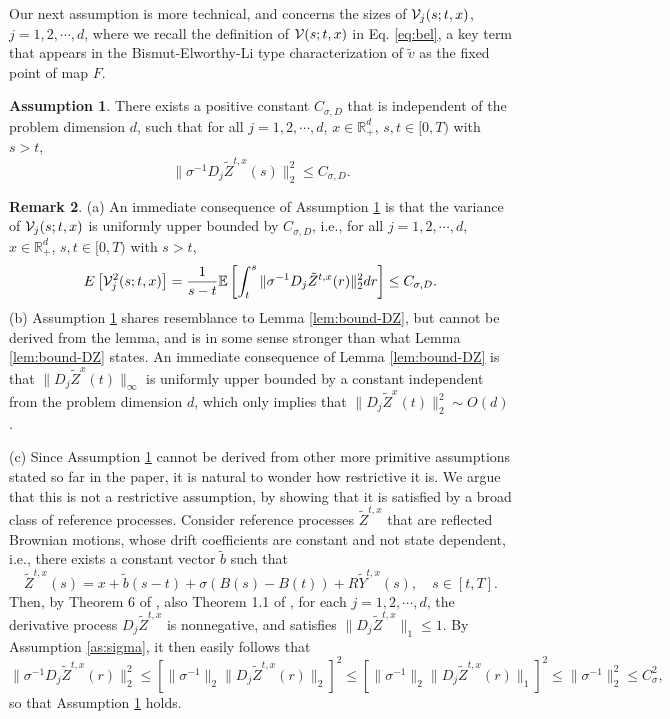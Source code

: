 \documentclass[11pt]{article}
\theoremstyle{definition}
\newtheorem{assumption}{Assumption}[section]
\newtheorem{remark}[assumption]{Remark}
\theoremstyle{plain}
\newcommand{\R}{\mathbb{R}}
\newcommand{\E}{\mathbb{E}}
\newcommand{\cV}{{\cal V}}
\newcommand{\tb}{\tilde{b}}
\begin{document}
Our next assumption is more technical, and concerns the sizes of $\cV_j(s; t,x)$, $j = 1, 2, \cdots, d$, 
where we recall the definition of $\cV(s; t,x)$ in Eq. \eqref{eq:bel}, a key term that appears in the Bismut-Elworthy-Li type 
characterization of $\tilde v$ as the fixed point of map $F$.
\begin{assumption}\label{as:sigma-D}
There exists a positive constant $C_{\sigma, D}$ that is independent of the problem dimension $d$, such that 
for all $j=1,2, \cdots, d$, $x\in \R_+^d$, $s, t \in [0, T)$ with $s > t$, 
\begin{equation}\label{eq:sigma-D}
\|\sigma^{-1} D_j \tilde Z^{t,x}(s)\|_2^2 \leq C_{\sigma, D}.
\end{equation}
\end{assumption}
\begin{remark} 
(a) An immediate consequence of Assumption \ref{as:sigma-D} is that the variance of $\cV_j(s; t,x)$ is uniformly upper bounded by $C_{\sigma, D}$, i.e., 
for all $j=1,2, \cdots, d$, $x\in \R_+^d$, $s, t \in [0, T)$ with $s > t$, 
\begin{equation}
E\left[\cV_j^2(s; t,x)\right] = \frac{1}{s-t}\E\left[\int_t^s \|\sigma^{-1} D_j \tilde Z^{t,x}(r)\|_2^2 dr\right] \leq C_{\sigma, D}.
\end{equation}
(b) Assumption \ref{as:sigma-D} shares resemblance to Lemma \ref{lem:bound-DZ}, but cannot be derived from the lemma, 
and is in some sense stronger than what Lemma \ref{lem:bound-DZ} states. 
An immediate consequence of Lemma \ref{lem:bound-DZ} is that $\|D_j \tilde Z^x(t)\|_\infty$ is uniformly upper bounded by 
a constant independent from the problem dimension $d$, which only implies that $\|D_j \tilde Z^x(t)\|_2^2 \sim O(d)$.

(c) Since Assumption \ref{as:sigma-D} cannot be derived from other more primitive assumptions stated so far in the paper, 
it is natural to wonder how restrictive it is. We argue that this is not a restrictive assumption, 
by showing that it is satisfied by a broad class of reference processes. Consider reference processes $\tilde Z^{t,x}$ 
that are reflected Brownian motions, whose drift coefficients are constant and not state dependent, i.e., 
there exists a constant vector $\tb$ such that 
\begin{equation}
\tilde{Z}^{t,x}(s) = x + \tb (s-t) + \sigma (B(s) - B(t)) + R \tilde{Y}^{t,x}(s), \quad s \in [t,T].
\end{equation}
Then, by Theorem 6 of \cite{KellaWhitt1996}, also Theorem 1.1 of \cite{KellaRamasubramanian2012},  
for each $j=1, 2, \cdots, d$, the derivative process $D_j \tilde Z^{t,x}$ is nonnegative, 
and satisfies $\|D_j \tilde Z^{t,x}\|_1 \leq 1$. By Assumption \ref{as:sigma}, 
it then easily follows that 
\[
\|\sigma^{-1} D_j \tilde Z^{t,x}(r)\|_2^2 \leq \left[\|\sigma^{-1}\|_2 \|D_j \tilde Z^{t,x}(r)\|_2\right]^2 
\leq \left[\|\sigma^{-1}\|_2 \|D_j \tilde Z^{t,x}(r)\|_1\right]^2
\leq \|\sigma^{-1}\|_2^2 \leq C_\sigma^2, 
\]
so that Assumption \ref{as:sigma-D} holds.
\end{remark}
\end{document}
